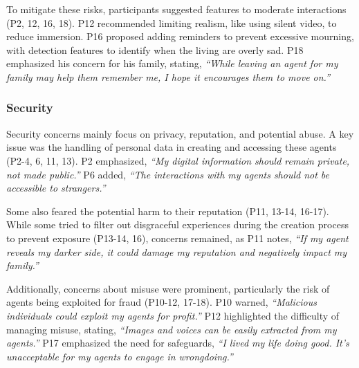 To mitigate these risks, participants suggested features to moderate interactions (P2, 12, 16, 18). P12 recommended limiting realism, like using silent video, to reduce immersion. P16 proposed adding reminders to prevent excessive mourning, with detection features to identify when the living are overly sad. P18 emphasized his concern for his family, stating, \textit{``While leaving an agent for my family may help them remember me, I hope it encourages them to move on.''}

\subsubsection{Security}

Security concerns mainly focus on privacy, reputation, and potential abuse. A key issue was the handling of personal data in creating and accessing these agents (P2-4, 6, 11, 13). P2 emphasized, \textit{``My digital information should remain private, not made public.''} P6 added, \textit{``The interactions with my agents should not be accessible to strangers.''}

Some also feared the potential harm to their reputation (P11, 13-14, 16-17). While some tried to filter out disgraceful experiences during the creation process to prevent exposure (P13-14, 16), concerns remained, as P11 notes, \textit{``If my agent reveals my darker side, it could damage my reputation and negatively impact my family.''}

Additionally, concerns about misuse were prominent, particularly the risk of agents being exploited for fraud (P10-12, 17-18). P10 warned, \textit{``Malicious individuals could exploit my agents for profit.''} P12 highlighted the difficulty of managing misuse, stating, \textit{``Images and voices can be easily extracted from my agents.''} P17 emphasized the need for safeguards, \textit{``I lived my life doing good. It's unacceptable for my agents to engage in wrongdoing.''} 

